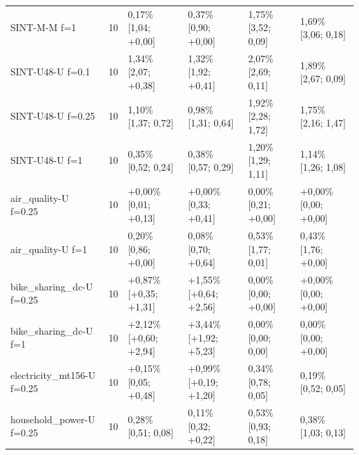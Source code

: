 \begin{table}[htbp]
\begin{tabular}{lrllll}
SINT-M-M f=1 & 10 & \textminus{}0,17\% [\textminus{}1,04; +0,00] & \textminus{}0,37\% [\textminus{}0,90; +0,00] & \textminus{}1,75\% [\textminus{}3,52; \textminus{}0,09] & \textminus{}1,69\% [\textminus{}3,06; \textminus{}0,18] \\
SINT-U48-U f=0.1 & 10 & \textminus{}1,34\% [\textminus{}2,07; +0,38] & \textminus{}1,32\% [\textminus{}1,92; +0,41] & \textminus{}2,07\% [\textminus{}2,69; \textminus{}0,11] & \textminus{}1,89\% [\textminus{}2,67; \textminus{}0,09] \\
SINT-U48-U f=0.25 & 10 & \textminus{}1,10\% [\textminus{}1,37; \textminus{}0,72] & \textminus{}0,98\% [\textminus{}1,31; \textminus{}0,64] & \textminus{}1,92\% [\textminus{}2,28; \textminus{}1,72] & \textminus{}1,75\% [\textminus{}2,16; \textminus{}1,47] \\
SINT-U48-U f=1 & 10 & \textminus{}0,35\% [\textminus{}0,52; \textminus{}0,24] & \textminus{}0,38\% [\textminus{}0,57; \textminus{}0,29] & \textminus{}1,20\% [\textminus{}1,29; \textminus{}1,11] & \textminus{}1,14\% [\textminus{}1,26; \textminus{}1,08] \\
air\_quality-U f=0.25 & 10 & +0,00\% [\textminus{}0,01; +0,13] & +0,00\% [\textminus{}0,33; +0,41] & \textminus{}0,00\% [\textminus{}0,21; +0,00] & +0,00\% [\textminus{}0,00; +0,00] \\
air\_quality-U f=1 & 10 & \textminus{}0,20\% [\textminus{}0,86; +0,00] & \textminus{}0,08\% [\textminus{}0,70; +0,64] & \textminus{}0,53\% [\textminus{}1,77; \textminus{}0,01] & \textminus{}0,43\% [\textminus{}1,76; +0,00] \\
bike\_sharing\_dc-U f=0.25 & 10 & +0,87\% [+0,35; +1,31] & +1,55\% [+0,64; +2,56] & \textminus{}0,00\% [\textminus{}0,00; +0,00] & +0,00\% [\textminus{}0,00; +0,00] \\
bike\_sharing\_dc-U f=1 & 10 & +2,12\% [+0,60; +2,94] & +3,44\% [+1,92; +5,23] & \textminus{}0,00\% [\textminus{}0,00; \textminus{}0,00] & \textminus{}0,00\% [\textminus{}0,00; +0,00] \\
electricity\_mt156-U f=0.25 & 10 & +0,15\% [\textminus{}0,05; +0,48] & +0,99\% [+0,19; +1,20] & \textminus{}0,34\% [\textminus{}0,78; \textminus{}0,05] & \textminus{}0,19\% [\textminus{}0,52; \textminus{}0,05] \\
household\_power-U f=0.25 & 10 & \textminus{}0,28\% [\textminus{}0,51; \textminus{}0,08] & \textminus{}0,11\% [\textminus{}0,32; +0,22] & \textminus{}0,53\% [\textminus{}0,93; \textminus{}0,18] & \textminus{}0,38\% [\textminus{}1,03; \textminus{}0,13] \\

\end{tabular}
\end{table}
